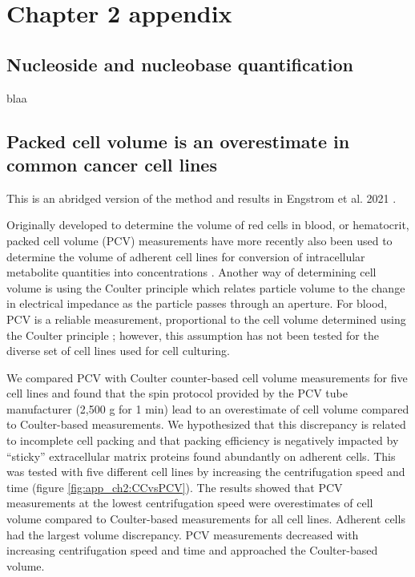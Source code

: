 \chapter{Chapter 2 appendix}
\section{Nucleoside and nucleobase quantification}
blaa




















\section{Packed cell volume is an overestimate in common cancer cell lines}
\label{app_ch2_cell_vol}
This is an abridged version of the method and results in Engstrom et al. 2021 \cite{Engstrom2021-az}.

Originally developed to determine the volume of red cells in blood, or hematocrit, packed cell volume (PCV) measurements have more recently also been used to determine the volume of adherent cell lines for conversion of intracellular metabolite quantities into concentrations \cite{Park2016-ap, Liu2018-it, Yang2020-fs, Ghergurovich2020-nb}.
Another way of determining cell volume is using the Coulter principle which relates particle volume to the change in electrical impedance as the particle passes through an aperture.
For blood, PCV is a reliable measurement, proportional to the cell volume determined using the Coulter principle \cite{Carter1968-xy, Bull2001-xb}; however, this assumption has not been tested for the diverse set of cell lines used for cell culturing.

We compared PCV with Coulter counter-based cell volume measurements for five cell lines and found that the spin protocol provided by the PCV tube manufacturer (2,500 g for 1 min) lead to an overestimate of cell volume compared to Coulter-based measurements.
We hypothesized that this discrepancy is related to incomplete cell packing and that packing efficiency is negatively impacted by ``sticky'' extracellular matrix proteins found abundantly on adherent cells.
This was tested with five different cell lines by increasing the centrifugation speed and time (figure \ref{fig:app_ch2:CCvsPCV}).
The results showed that PCV measurements at the lowest centrifugation speed were overestimates of cell volume compared to Coulter-based measurements for all cell lines.
Adherent cells had the largest volume discrepancy.
PCV measurements decreased with increasing centrifugation speed and time and approached the Coulter-based volume.

